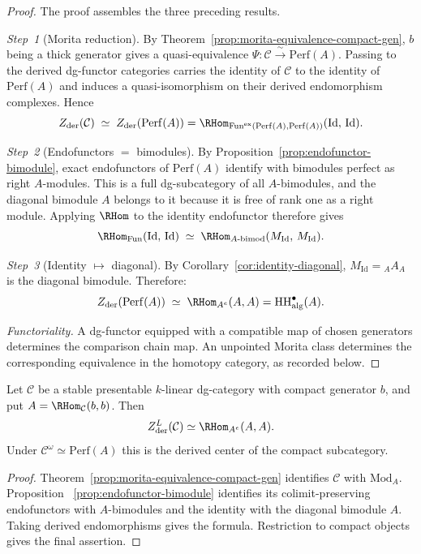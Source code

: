 \begin{proof}
The proof assembles the three preceding results.

\emph{Step~1} (Morita reduction).
By Theorem~\ref{prop:morita-equivalence-compact-gen}, $b$ being a
thick generator gives a quasi-equivalence
$\Psi\colon \mathcal{C} \xrightarrow{\;\sim\;} \mathrm{Perf}(A)$.
Passing to the derived dg-functor categories carries the identity of
$\mathcal C$ to the identity of $\mathrm{Perf}(A)$ and induces a
quasi-isomorphism on their derived endomorphism complexes.  Hence
\[
Z_{\mathrm{der}}(\mathcal{C})
\;\simeq\;
Z_{\mathrm{der}}(\mathrm{Perf}(A))
= \RHom_{\mathrm{Fun}^{\mathrm{ex}}(\mathrm{Perf}(A), \mathrm{Perf}(A))}
 (\mathrm{Id},\, \mathrm{Id}).
\]

\emph{Step~2} (Endofunctors $=$ bimodules).
By Proposition~\ref{prop:endofunctor-bimodule}, exact endofunctors of
$\mathrm{Perf}(A)$ identify with bimodules perfect as right
$A$-modules.  This is a full dg-subcategory of all $A$-bimodules, and
the diagonal bimodule $A$ belongs to it because it is free of rank one
as a right module.  Applying $\RHom$ to the identity endofunctor
therefore gives
\[
\RHom_{\mathrm{Fun}}(\mathrm{Id},\, \mathrm{Id})
\;\simeq\;
\RHom_{A\text{-}\mathrm{bimod}}
 (M_{\mathrm{Id}},\, M_{\mathrm{Id}}).
\]

\emph{Step~3} (Identity $\mapsto$ diagonal).
By Corollary~\ref{cor:identity-diagonal}, $M_{\mathrm{Id}} = {}_A A_A$
is the diagonal bimodule. Therefore:
\[
Z_{\mathrm{der}}(\mathrm{Perf}(A))
\;\simeq\;
\RHom_{A^e}(A, A)
= \mathrm{HH}^\bullet_{\mathrm{alg}}(A).
\]

\emph{Functoriality.}  A dg-functor equipped with a compatible map of
chosen generators determines the comparison chain map.  An unpointed
Morita class determines the corresponding equivalence in the homotopy
category, as recorded below.
\end{proof}

\begin{corollary}
\label{cor:continuous-center-compact-generator}
Let $\mathcal C$ be a stable presentable $k$-linear dg-category with
compact generator $b$, and put $A=\RHom_{\mathcal C}(b,b)$.  Then
\[
 Z_{\mathrm{der}}^{L}(\mathcal C)
 \simeq
 \RHom_{A^e}(A,A).
\]
Under $\mathcal C^\omega\simeq\mathrm{Perf}(A)$ this is the derived
center of the compact subcategory.
\end{corollary}

\begin{proof}
Theorem~\ref{prop:morita-equivalence-compact-gen} identifies
$\mathcal C$ with $\mathrm{Mod}_A$.  Proposition~
\ref{prop:endofunctor-bimodule} identifies its colimit-preserving
endofunctors with $A$-bimodules and the identity with the diagonal
bimodule $A$.  Taking derived endomorphisms gives the formula.
Restriction to compact objects gives the final assertion.
\end{proof}

